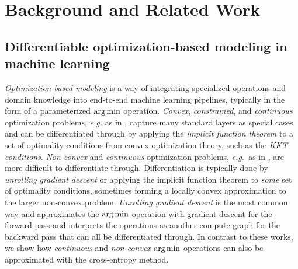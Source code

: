 \documentclass{article}
\newcommand{\eg}{{\it e.g.}\xspace}
\begin{document}
\section{Background and Related Work}
\subsection{Differentiable optimization-based modeling in machine learning}
\emph{Optimization-based modeling} is a way of integrating specialized
operations and domain knowledge into end-to-end machine learning pipelines,
typically in the form of a parameterized $\operatorname*{arg\,min}$ operation.
\emph{Convex}, \emph{constrained}, and \emph{continuous} optimization problems,
\eg as in
\citet{gould2016differentiating,johnson2016composing,amos2017input,amos2017optnet,agrawal2019differentiable},
capture many standard layers as special cases and
can be differentiated through by applying the \emph{implicit function theorem}
to a set of optimality conditions from convex optimization theory,
such as the \emph{KKT conditions}.
\emph{Non-convex} and \emph{continuous} optimization problems,
\emph{e.g.}\ as in
\citet{domke2012generic,belanger2016structured,metz2016unrolled,finn2017model,belanger2017end,rusu2018meta,srinivas2018universal,foerster2018learning,amos2018differentiable,pedregosa2016hyperparameter,jenni2018deep,rajeswaran2019meta,zhang2019deep},
are more difficult to differentiate through.
Differentiation is typically done by \emph{unrolling gradient descent}
or applying the implicit function theorem to \emph{some}
set of optimality conditions, sometimes forming a locally
convex approximation to the larger non-convex problem.
\emph{Unrolling gradient descent} is the most common way and approximates
the $\operatorname*{arg\,min}$ operation with gradient descent for the forward pass and
interprets the operations as another compute graph for the backward pass
that can all be differentiated through.
In contrast to these works, we show how \emph{continuous} and
\emph{non-convex} $\operatorname*{arg\,min}$ operations can also be approximated with
the cross-entropy method.
\end{document}
